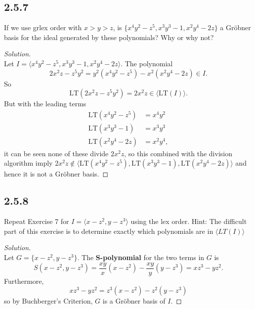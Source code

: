 \documentclass[]{article}
\newcommand\<{\langle}
\renewcommand\>{\rangle}
\newenvironment{solution}
{
	\begin{proof}[Solution] \text{ }
		\\
	}
	{
	\end{proof}
}
\begin{document}
\subsection*{2.5.7} If we use grlex order with $x > y > z$, is $\{x^4y^2-z^5,x^3y^3-1,x^2y^4-2z\}$ a Gröbner basis for the ideal generated by these polynomials? Why or why not?
\begin{solution}
	Let $I = \<x^4y^2-z^5,x^3y^3-1,x^2y^4-2z\>$. The polynomial
	$$
		2x^2z - z^5y^2 = y^2\left(x^4y^2 - z^5\right) - x^2\left(x^2y^4 - 2z\right) \in I.
	$$
	So
	$$
		\text{LT}(2x^2z - z^5y^2) = 2x^2z \in \<\text{LT}(I)\>.
	$$
	But with the leading terms
	\begin{align*}
		\text{LT}(x^4y^2-z^5) &= x^4y^2 \\
		\text{LT}(x^3y^3-1) &= x^3y^3 \\
		\text{LT}(x^2y^4-2z) &= x^2y^4,
	\end{align*}
	it can be seen none of these divide $2x^2z$, so this combined with the division algorithm imply $2x^2z \notin \<\text{LT}(x^4y^2-z^5), \text{LT}(x^3y^3-1), \text{LT}(x^2y^4-2z)\>$ and hence it is not a Gröbner basis.
\end{solution}

\subsection*{2.5.8} Repeat Exercise 7 for $I = \<x - z^2, y - z^3\>$ using the lex order. Hint: The difficult part of this exercise is to determine exactly which polynomials are in $\<LT(I)\>$
\begin{solution}
	Let $G = \{x - z^2, y-z^3\}$. The \textbf{S-polynomial} for the two terms in $G$ is
	$$
		S(x - z^2, y-z^3) = \frac{xy}{x}\left(x - z^2\right) - \frac{xy}{y}\left(y - z^3\right) = xz^3 - yz^2.
	$$
	Furthermore,
	$$
		xz^3 - yz^2 = z^3\left(x - z^2\right) - z^2\left(y - z^3\right)
	$$
	so by Buchberger's Criterion, $G$ is a Gröbner basis of $I$.
\end{solution}
\end{document}
